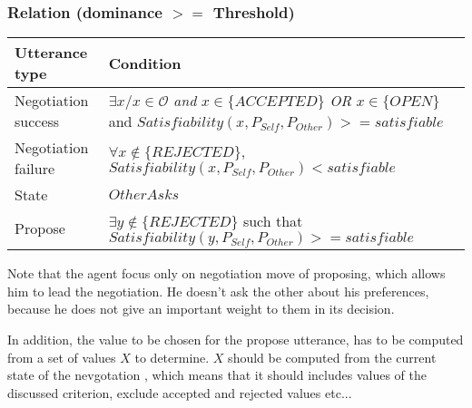 \documentclass{article}
\begin{document}
	\subsubsection{Relation (\textbf{dominance $>=$ Threshold})}
	\begin{tabular}{|p{3cm}|p{9cm}|}
		\hline
		\textbf{Utterance type} & Condition \\
		\hline
		 Negotiation success &  $\exists x/ x \in \mathcal{O}$  \emph{and} $x \in \{ACCEPTED\}$  \newline \emph{OR} \newline $x \in \{OPEN\}$ and \newline $Satisfiability(x, P_{Self}, P_{Other}) >= satisfiable$ \\
		\hline
		Negotiation failure & $ \forall x \notin \{REJECTED\}$, \newline  $Satisfiability(x, P_{Self}, P_{Other}) < satisfiable $ \\
		\hline
		State & $OtherAsks$ \\
		\hline
		Propose & $\exists y \notin \{REJECTED\}$ such that \newline $Satisfiability(y, P_{Self}, P_{Other}) >= satisfiable $  
\\
		
	\hline
	\end{tabular}
	
		\par Note that the agent focus only on negotiation move of proposing, which allows him to lead the negotiation. He doesn't ask the other about his preferences, because he does not give an important weight to them in its decision.
		
		In addition, the value to be chosen for the propose utterance, has to be computed from a set of values $X$ to determine. $X$ should be computed from the current state of the nevgotation , which means that it should includes values of the discussed criterion, exclude accepted and rejected values etc...
	
\end{document}
